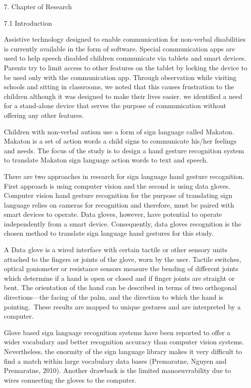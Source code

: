 7. Chapter of Research 

7.1 Introduction 

Assistive technology designed to enable communication for non-verbal disabilities is currently available in the form of software.  Special communication apps are used to help speech disabled children communicate via tablets and smart devices.  Parents try to limit access to other features on the tablet by locking the device to be used only with the communication app. Through observation while visiting schools and sitting in classrooms, we noted that this causes frustration to the children although it was designed to make their lives easier.  we identified a need for a stand-alone device that serves the purpose of communication without offering any other features.

Children with non-verbal autism use a form of sign language called Makaton. Makaton is a set of action words a child signs to communicate his/her feelings and needs. The focus of the study is to design a hand gesture recognition system to translate Makaton sign language action words to text and speech.  

There are two approaches in research for sign language hand gesture recognition.  First approach is using computer vision and the second is using data gloves.  Computer vision hand gesture recognition for the purpose of translating sign language relies on cameras for recognition and therefore, must be paired with smart devices to operate.  Data gloves, however, have potential to operate independently from a smart device.  Consequently, data gloves recognition is the chosen method to translate sign language hand gestures for this study. 

A Data glove is a wired interface with certain tactile or other sensory units attached to the fingers or joints of the glove, worn by the user. Tactile switches, optical goniometer or resistance sensors measure the bending of different joints which determine if a hand is open or closed and if finger joints are straight or bent. The orientation of the hand can be described in terms of two orthogonal directions—the facing of the palm, and the direction to which the hand is pointing. These results are mapped to unique gestures and are interpreted by a computer. 

Glove based sign language recognition systems have been reported to offer a wider vocabulary and better recognition accuracy than computer vision systems. Nevertheless, the enormity of the sign language library makes it very difficult to find a match within large vocabulary data bases (Premaratne, Nguyen and Premaratne, 2010). Another drawback is the limited manoeuvrability due to wires connecting the gloves to the computer. 

